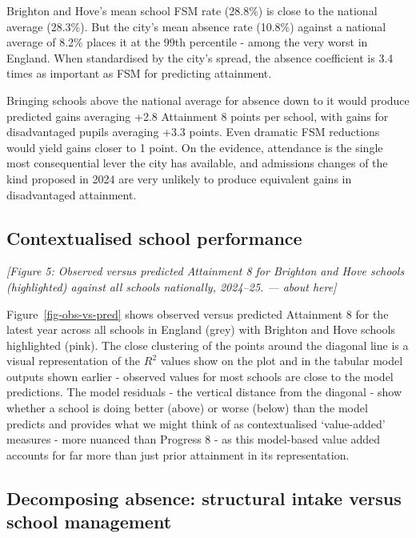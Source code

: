 \documentclass[
  12pt,
  titlepage]{article}
\begin{document}
Brighton and Hove's mean school FSM rate (28.8\%) is close to the
national average (28.3\%). But the city's mean absence rate (10.8\%)
against a national average of 8.2\% places it at the 99th percentile -
among the very worst in England. When standardised by the city's spread,
the absence coefficient is 3.4 times as important as FSM for predicting
attainment.

Bringing schools above the national average for absence down to it would
produce predicted gains averaging +2.8 Attainment 8 points per school,
with gains for disadvantaged pupils averaging +3.3 points. Even dramatic
FSM reductions would yield gains closer to 1 point. On the evidence,
attendance is the single most consequential lever the city has
available, and admissions changes of the kind proposed in 2024 are very
unlikely to produce equivalent gains in disadvantaged attainment.

\subsection{Contextualised school
performance}\label{contextualised-school-performance}

\emph{{[}Figure 5: Observed versus predicted Attainment 8 for Brighton
and Hove schools (highlighted) against all schools nationally, 2024--25.
--- about here{]}}

Figure~\ref{fig-obs-vs-pred} shows observed versus predicted Attainment
8 for the latest year across all schools in England (grey) with Brighton
and Hove schools highlighted (pink). The close clustering of the points
around the diagonal line is a visual representation of the \(R^2\)
values show on the plot and in the tabular model outputs shown earlier -
observed values for most schools are close to the model predictions. The
model residuals - the vertical distance from the diagonal - show whether
a school is doing better (above) or worse (below) than the model
predicts and provides what we might think of as contextualised
`value-added' measures - more nuanced than Progress 8 - as this
model-based value added accounts for far more than just prior attainment
in its representation.

\subsection{Decomposing absence: structural intake versus school
management}\label{decomposing-absence-structural-intake-versus-school-management}
\end{document}
